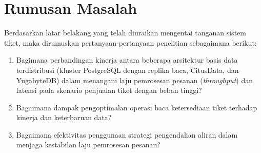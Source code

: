 \section{Rumusan Masalah}
\label{sec:rumusan-masalah}

Berdasarkan latar belakang yang telah diuraikan mengentai tanganan sistem tiket, maka dirumuskan pertanyaan-pertanyaan penelitian sebagaimana berikut:

\begin{enumerate}
    \item Bagimana perbandingan kinerja antara beberapa arsitektur basis data terdistribusi (kluster PostgreSQL dengan replika baca, CitusData, dan YugabyteDB) dalam menangani laju pemrosesan pesanan (\textit{throughput}) dan latensi pada skenario penjualan tiket dengan beban tinggi?
    \item Bagaimana dampak pengoptimalan operasi baca ketersediaan tiket terhadap kinerja dan keterbaruan data?
    \item Bagaimana efektivitas penggunaan strategi pengendalian aliran dalam menjaga kestabilan laju pemrosesan pesanan?
\end{enumerate}
